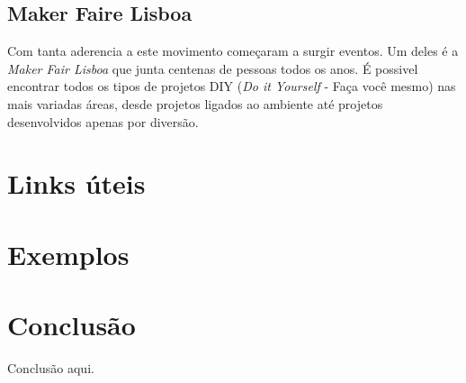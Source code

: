 \documentclass{article}
\begin{document}
\subsection{Maker Faire Lisboa}
Com tanta aderencia a este movimento começaram a surgir eventos. Um deles é a \textit{Maker Fair Lisboa} que junta centenas de pessoas todos os anos. É possivel encontrar todos os tipos de projetos DIY (\textit{Do it Yourself} - Faça você mesmo) nas mais variadas áreas, desde projetos ligados ao ambiente até projetos desenvolvidos apenas por diversão.

\section{Links úteis}

\section{Exemplos}

\section{Conclusão}
Conclusão aqui.
\end{document}
